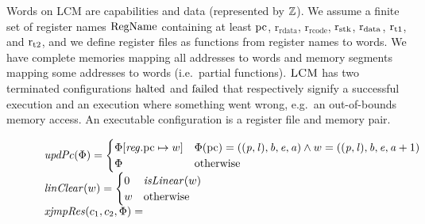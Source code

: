 \documentclass[acmsmall,review,showframe]{acmart}\settopmatter{printfolios=true,printccs=false,printacmref=false}
\renewcommand{\RegName}{\shareddom{RegName}}
\renewcommand{\decInstr}[1]{\plainfun{decode}{#1}}
\renewcommand{\updPcAddr}[1]{\plainfun{updPc}{#1}}
\renewcommand{\linCons}[1]{\plainfun{linClear}{#1}}
\renewcommand{\perm}{\var{p}}
\renewcommand{\rretc}{\mathrm{r}_{\mathrm{rcode}}}
\renewcommand{\rretd}{\mathrm{r}_{\mathrm{rdata}}}
\newcommand{\xjmpres}[1]{\plainfun{xjmpRes}{#1}}
\newcommand{\trgcm}{\textsc{LCM}}
\begin{document}
Words on \trgcm{} are capabilities and data (represented by $\mathbb{Z}$).
We assume a finite set of register names $\RegName$ containing at least $\mathrm{pc}$, $\rretd$, $\rretc$, $\mathrm{r}_\mathrm{stk}$, $\mathrm{r}_\mathrm{data}$, $\mathrm{r}_\mathrm{t1}$, and $\mathrm{r}_\mathrm{t2}$, and we define register files as functions from register names to words.
We have complete memories mapping all addresses to words and memory segments mapping some addresses to words (i.e.\ partial functions).
$\trgcm{}$ has two terminated configurations $\mathrm{halted}$ and $\mathrm{failed}$ that respectively signify a successful execution and an execution where something went wrong, e.g.\ an out-of-bounds memory access.
An executable configuration is a register file and memory pair.

\begin{figure}[p]
  \centering
  \[
    \begin{array}{l}
  \updPcAddr{\Phi} =
  \begin{cases}
    \Phi\updReg{\pcreg}{w} & \Phi(\pcreg) = ((\perm,\lin),\baddr,\eaddr,\aaddr) \wedge w = ((\perm,\lin),\baddr,\eaddr,\aaddr+1)\\
    \Phi  & \totherwise
  \end{cases}\\
  \linCons{w} =
  \begin{cases}
    0 & \isLinear{w} \\
    w & \totherwise
  \end{cases}\\
  \xjmpres{c_1,c_2,\Phi} =

\end{array}\]
\end{figure}
\end{document}
